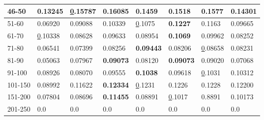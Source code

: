 \begin{table*}[]
\begin{tabular}{|l|l|l|l|l|l|l||l|}
        46-50     & 0.13245                        & {\ul 0.15787}                  & \textbf{0.16085}               & 0.1459                         & 0.1518                         & 0.1577                          & 0.14301                    \\ \hline
        51-60     & 0.06920                        & 0.09088                        & 0.10339                        & {\ul 0.1075}                   & \textbf{0.1227}                & 0.1163                          & 0.09665                    \\ \hline
        61-70     & {\ul 0.10338}                  & 0.08628                        & 0.09633                        & 0.08954                        & \textbf{0.1069}                & 0.09962                         & 0.08252                    \\ \hline
        71-80     & 0.06541                        & 0.07399                        & 0.08256                        & \textbf{0.09443}               & 0.08206                        & {\ul 0.08658}                   & 0.08231                    \\ \hline
        81-90     & 0.05063                        & 0.07967                        & \textbf{0.09073}               & 0.08120                        & \textbf{0.09073}               & 0.09020                         & 0.07068                    \\ \hline
        91-100    & 0.08926                        & 0.08070                        & 0.09555                        & \textbf{0.1038}                & 0.09618                        & {\ul 0.1031}                    & 0.10312                    \\ \hline
        101-150   & 0.08992                        & 0.11622                        & \textbf{0.12334}               & {\ul 0.1231}                   & 0.1226                         & 0.1228                          & 0.12200                    \\ \hline
        151-200   & 0.07804                        & 0.08696                        & \textbf{0.11455}               & 0.08891                        & {\ul 0.1017}                   & 0.8891                          & 0.10173                    \\ \hline
        201-250   & 0.0                            & 0.0                            & 0.0                            & 0.0                            & 0.0                            & 0.0                             & 0.0                        \\ \hline

\end{tabular}
\end{table*}
